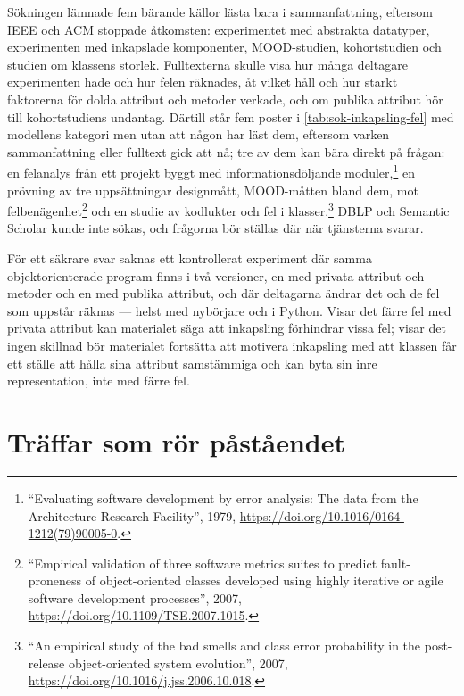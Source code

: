 Sökningen lämnade fem bärande källor lästa bara i sammanfattning,
eftersom IEEE och ACM stoppade åtkomsten: experimentet med abstrakta
datatyper\autocite{Meeson1979DataAbstraction}, experimenten med
inkapslade komponenter\autocite{Zweben1995Layering},
MOOD-studien\autocite{BritoeAbreu1996Impact},
kohortstudien\autocite{Nocera2026Cohort} och studien om klassens
storlek\autocite{ElEmam2001Confounding}.  Fulltexterna skulle visa hur
många deltagare experimenten hade och hur felen räknades, åt vilket håll
och hur starkt faktorerna för dolda attribut och metoder verkade, och om
publika attribut hör till kohortstudiens undantag.  Därtill står fem
poster i \cref{tab:sok-inkapsling-fel} med modellens kategori men utan
att någon har läst dem, eftersom varken sammanfattning eller fulltext
gick att nå; tre av dem kan bära direkt på frågan: en felanalys från ett
projekt byggt med informationsdöljande
moduler,\footnote{\enquote{Evaluating software development by error
analysis: The data from the Architecture Research Facility}, 1979,
\url{https://doi.org/10.1016/0164-1212(79)90005-0}.} en prövning av tre
uppsättningar designmått, MOOD-måtten bland dem, mot
felbenägenhet\footnote{\enquote{Empirical validation of three software
metrics suites to predict fault-proneness of object-oriented classes
developed using highly iterative or agile software development
processes}, 2007, \url{https://doi.org/10.1109/TSE.2007.1015}.} och en
studie av kodlukter och fel i klasser.\footnote{\enquote{An empirical
study of the bad smells and class error probability in the post-release
object-oriented system evolution}, 2007,
\url{https://doi.org/10.1016/j.jss.2006.10.018}.}  DBLP och Semantic
Scholar kunde inte sökas, och frågorna bör ställas där när tjänsterna
svarar.

För ett säkrare svar saknas ett kontrollerat experiment där samma
objektorienterade program finns i två versioner, en med privata attribut
och metoder och en med publika attribut, och där deltagarna ändrar det och
de fel som uppstår räknas --- helst med nybörjare och i Python.  Visar
det färre fel med privata attribut kan materialet säga att inkapsling
förhindrar vissa fel; visar det ingen skillnad bör materialet fortsätta
att motivera inkapsling med att klassen får ett ställe att hålla sina
attribut samstämmiga och kan byta sin inre representation, inte med
färre fel.

\section{Träffar som rör påståendet}
\label{sec:inkf-traffar}

